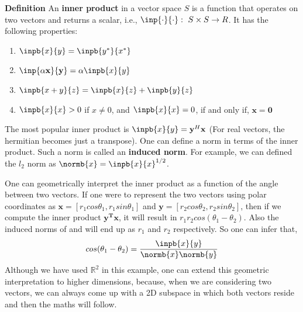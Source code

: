 	\begin{highlightedText}
	\textbf{Definition} An \textbf{inner product} in a vector space \(S\) is a function that operates on two vectors and returns a scalar, i.e., \( \inp{\cdot} {\cdot}:\ S \times S \rightarrow R\). It has the following properties:
	\begin{enumerate}
	\item \( \inpb{x}{y} = \inpb{y^*}{x^*}\)
	\item \( \inp{\alpha \mathbf{x}}{\mathbf{y}} = \alpha \inpb{x}{y} \)
	\item \( \inpb{x+y}{z} = \inpb{x}{z} + \inpb{y}{z} \)
	\item \( \inpb{x}{x} > 0 \) if \( x \neq 0 \), and \( \inpb{x}{x} = 0 \), if and only if, \( \mathbf{x} = \mathbf{0} \) 
	\end{enumerate}
	\end{highlightedText}

The most popular inner product is \( \inpb{x}{y} = \mathbf{y}^H \mathbf{x} \) (For real vectors, the hermitian becomes just a transpose). One can define a norm in terms of the inner product. Such a norm is called an \textbf{induced norm}. For example, we can defined the \(l_2\) norm as \( \normb{x} = {\inpb{x}{x}}^{1/2} \). 

One can geometrically interpret the inner product as a function of the angle between two vectors. If one were to represent the two vectors using polar coordinates as \( \mathbf{x} = [r_1 cos\theta_1, r_1 sin\theta_1] \) and \( \mathbf{y} = [r_2 cos\theta_2, r_2 sin\theta_2] \), then if we compute the inner product \( \mathbf{y^Tx} \), it will result in \(r_1 r_2 cos(\theta_1 - \theta_2)\). Also the induced norms of  and  will end up as \(r_1\) and \(r_2\) respectively. So one can infer that, 
	\[ cos(\theta_1 - \theta_2) = \frac{\inpb{x}{y}}{\normb{x}\normb{y}} \]
Although we have used \(\mathbb{R}^2\) in this example, one can extend this geometric interpretation to higher dimensions, because, when we are considering two vectors, we can always come up with a 2D subspace in which both vectors reside and then the maths will follow. 

